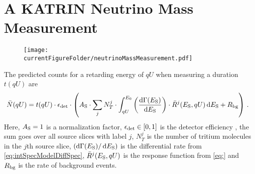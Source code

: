 \def\currentRootFolder{chapter/modelOfIntegratedRate/neutrinoMassMeasurement}
\def\currentFigureFolder{\currentRootFolder/fig}



\section{A KATRIN Neutrino Mass Measurement}
\label{sec:katrinExpNuMassMeasurement}
\begin{figure}
	\centering
	\texttt{[image: \\currentFigureFolder/neutrinoMassMeasurement.pdf]}
	\label{fig:katrinExpNuMassMeasurement}
\end{figure}


The predicted counts for a retarding energy of $qU$ when measuring a duration $t(qU)$ are
\begin{equation}
\label{eq:intSpecModelCountsFinal}
\bar{N}(qU) = t(qU) \cdot \epsilon_\mathrm{det} \cdot \left(
A_\mathrm{S} \cdot
\sum_{j}
N_T^j \cdot
\int_{qU}^{E_0} 
\left(\frac{\mathop{}\!\mathrm{d} \Gamma(E_\mathrm{S})}{ \mathop{}\!\mathrm{d} E_\mathrm{S}}\right) \cdot 
\bar{R}^j(E_\mathrm{S}, qU) 
\mathop{}\!\mathrm{d} E_\mathrm{S} +
R_\mathrm{bg}
\right)
\text{\,.}
\end{equation}
Here, $A_\mathrm{S}=1$ is a normalization factor, $\epsilon_\mathrm{det} \in [0,1]$ is the detector efficiency , the sum goes over all source slices with label $j$, $N_T^j$ is the number of tritium molecules in the $j$th source slice, $\left(\mathop{}\!\mathrm{d} \Gamma(E_\mathrm{S}) / \mathop{}\!\mathrm{d} E_\mathrm{S} \right)$ is the differential rate from \eqref{eq:intSpecModelDiffSpec}, $\bar{R}^j(E_\mathrm{S}, qU)$ is the response function from \eqref{eq:} and $R_\mathrm{bg}$ is the rate of background events.

